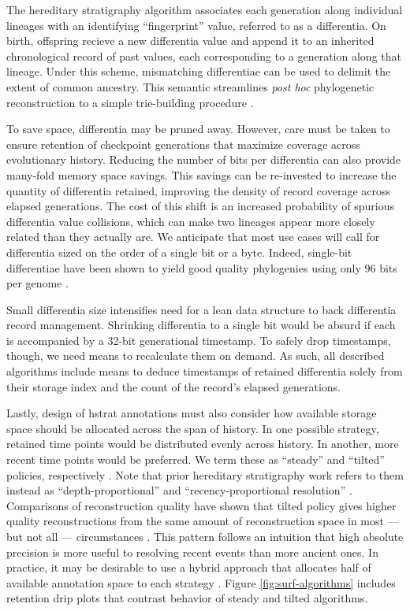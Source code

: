 The hereditary stratigraphy algorithm associates each generation along individual lineages with an identifying ``fingerprint'' value, referred to as a differentia.
On birth, offspring recieve a new differentia value and append it to an inherited chronological record of past values, each corresponding to a generation along that lineage.
Under this scheme, mismatching differentiae can be used to delimit the extent of common ancestry.
This semantic streamlines \textit{post hoc} phylogenetic reconstruction to a simple trie-building procedure
\citep{moreno2024analysis}.

To save space, differentia may be pruned away.
However, care must be taken to ensure retention of checkpoint generations that maximize coverage across evolutionary history.
Reducing the number of bits per differentia can also provide many-fold memory space savings.
This savings can be re-invested to increase the quantity of differentia retained, improving the density of record coverage across elapsed generations.
The cost of this shift is an increased probability of spurious differentia value collisions, which can make two lineages appear more closely related than they actually are.
We anticipate that most use cases will call for differentia sized on the order of a single bit or a byte.
Indeed, single-bit differentiae have been shown to yield good quality phylogenies using only 96 bits per genome \citep{moreno2024guide}.

Small differentia size intensifies need for a lean data structure to back differentia record management.
Shrinking differentia to a single bit would be absurd if each is accompanied by a 32-bit generational timestamp.
To safely drop timestamps, though, we need means to recalculate them on demand.
As such, all described algorithms include means to deduce timestamps of retained differentia solely from their storage index and the count of the record's elapsed generations.

Lastly, design of hstrat annotations must also consider how available storage space should be allocated across the span of history.
In one possible strategy, retained time points would be distributed evenly across history.
In another, more recent time points would be preferred.
We term these as ``steady'' and ``tilted'' policies, respectively \citep{han2005stream,zhao2005generalized}.
Note that prior hereditary stratigraphy work refers to them instead as ``depth-proportional'' and ``recency-proportional resolution'' \citep{moreno2022hereditary}.
Comparisons of reconstruction quality have shown that tilted policy gives higher quality reconstructions from the same amount of reconstruction space in most --- but not all --- circumstances \citep{moreno2024guide}.
This pattern follows an intuition that high absolute precision is more useful to resolving recent events than more ancient ones.
In practice, it may be desirable to use a hybrid approach that allocates half of available annotation space to each strategy \citep{moreno2024guide}.
Figure \ref{fig:surf-algorithms} includes retention drip plots that contrast behavior of steady and tilted algorithms.

